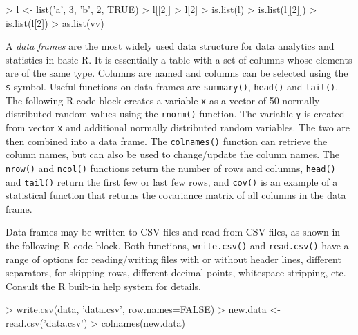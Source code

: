 \begin{samepage}
\begin{Rcode}
> l <- list('a', 3, 'b', 2, TRUE)
> l[[2]]
> l[2]
> is.list(l)
> is.list(l[[2]])
> is.list(l[2])
> as.list(vv)
\end{Rcode}
\end{samepage}

A \emph{data frames} are the most widely used data structure for data analytics and statistics in basic R. It is essentially a table with a set of columns whose elements are of the same type. Columns are named and columns can be selected using the \texttt{\$} symbol. Useful functions on data frames are \texttt{summary()}, \texttt{head()} and \texttt{tail()}. The following R code block creates a variable \texttt{x} as a vector of 50 normally distributed random values using the \texttt{rnorm()} function. The variable \texttt{y} is created from vector \texttt{x} and additional normally distributed random variables. The two are then combined into a data frame. The \texttt{colnames()} function can retrieve the column names, but can also be used to change/update the column names. The \texttt{nrow()} and \texttt{ncol()} functions return the number of rows and columns, \texttt{head()} and \texttt{tail()} return the first few or last few rows, and \texttt{cov()} is an example of a statistical function that returns the covariance matrix of all columns in the data frame.

\begin{samepage}
\end{samepage}

Data frames may be written to CSV files and read from CSV files, as shown in the following R code block. Both functions, \texttt{write.csv()} and \texttt{read.csv()} have a range of options for reading/writing files with or without header lines, different separators, for skipping rows, different decimal points, whitespace stripping, etc. Consult the R built-in help system for details.

\begin{samepage}
\begin{Rcode}
> write.csv(data, 'data.csv', row.names=FALSE)
> new.data <- read.csv('data.csv')
> colnames(new.data)
\end{Rcode}
\end{samepage}

